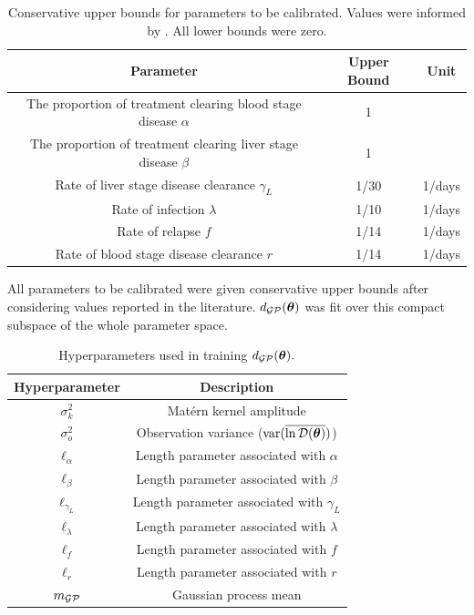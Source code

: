 \begin{table}[htbp]
    \caption[{
                Upper parameter bounds the 's
                \textit{P. vivax} model
            }]{
        Conservative upper bounds for parameters to be calibrated.
        Values were informed by
        \cite{champagne_using_2022, white_variation_2016}. All lower bounds
        were zero.
    }
    \label{tab:param_bounds}
    \centering
    \begin{tabular}{c |c |c}
        Parameter
         & Upper Bound & Unit   \\
        \hline
        The proportion of treatment clearing blood stage disease $\alpha$
         & 1           &        \\
        The proportion of treatment clearing liver stage disease $\beta$
         & 1           &        \\
        Rate of liver stage disease clearance $\gamma_L$
         & 1/30        & 1/days \\
        Rate of infection $\lambda$
         & 1/10        & 1/days \\
        Rate of relapse $f$
         & 1/14        & 1/days \\
        Rate of blood stage disease clearance $r$
         & 1/14        & 1/days
    \end{tabular}
\end{table}

All parameters to be calibrated were given conservative upper bounds after
considering values reported in the literature. $d_{\mathcal{GP}}(\bm{\theta})$ was fit
over this compact subspace of the whole parameter space.

\begin{table}[htbp]
    \caption[{
                List of hyperparameters optimised
            }]{
        Hyperparameters used in training $d_{\mathcal{GP}}(\bm{\theta}).$
    }
    \label{tab:hps}
    \centering
    \begin{tabular}{c|c}
        Hyperparameter    & Description                                \\
        \hline
        $\sigma_k^2$      & Mat\'ern kernel amplitude                  \\
        $\sigma_o^2$      & Observation variance ($\operatorname{var}(\overline{\ln\mathcal{D}(\bm{\theta})})$)    \\
        $\ell_\alpha$     & Length parameter associated with $\alpha$   \\
        $\ell_\beta$      & Length parameter associated with $\beta$    \\
        $\ell_{\gamma_L}$ & Length parameter associated with $\gamma_L$ \\
        $\ell_\lambda$    & Length parameter associated with $\lambda$  \\
        $\ell_f$          & Length parameter associated with $f$        \\
        $\ell_r$          & Length parameter associated with $r$        \\
        $m_{\mathcal{GP}}$           & Gaussian process mean
    \end{tabular}
\end{table}


